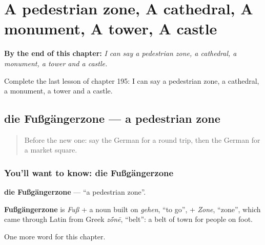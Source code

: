 
\chapter{A pedestrian zone, A cathedral, A monument, A tower, A castle}
\label{ch:ge-a-pedestrian-zone-a-cathedral-a-monument-a-tower-a-castle}

\begin{chapteropening}
\textbf{By the end of this chapter:} \emph{I can say a pedestrian zone, a cathedral, a monument, a tower and a castle.}

Complete the last lesson of chapter 195: I can say a pedestrian zone, a cathedral, a monument, a tower and a castle.
\end{chapteropening}

\section[die Fußgängerzone]{die Fußgängerzone — a pedestrian zone}

\label{lesson:GE-C195-fussgaengerzone}



\begin{quote}
Before the new one: say the German for a round trip, then the German for a market square.
\end{quote}

\subsection*{You'll want to know: die Fußgängerzone}
\textbf{die Fußgängerzone} — \textquotedblleft{}a pedestrian zone\textquotedblright{}.

\begin{cousinweb}
\textbf{Fußgängerzone} is \emph{Fuß} + a noun built on \emph{gehen}, \textquotedblleft{}to go\textquotedblright{}, + \emph{Zone}, \textquotedblleft{}zone\textquotedblright{}, which came through Latin from Greek \emph{z\'{\={o}}nē}, \textquotedblleft{}belt\textquotedblright{}: a belt of town for people on foot.
\end{cousinweb}

\begin{grammarlens}[title={What you've built}]
One more word for this chapter.
\end{grammarlens}

